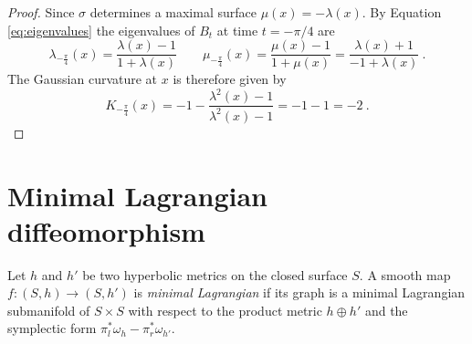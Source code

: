 \begin{proof}
    Since $\sigma$ determines a maximal surface $\mu(x) = - \lambda(x)$. By Equation \ref{eq:eigenvalues} the eigenvalues of $B_t$ at time $t=-\pi / 4$ are
    \[
        \lambda_{-\frac{\pi}{4}}(x) = \frac{\lambda(x) -1}{1 +\lambda(x)} \qquad \mu_{-\frac{\pi}{4}}(x) = \frac{\mu(x)-1}{1 + \mu(x)} = \frac{\lambda(x) + 1}{-1 + \lambda(x)} \ .
    \]
    The Gaussian curvature at $x$ is therefore given by
    \[
        K_{-\frac{\pi}{4}}(x) = - 1 - \frac{ \lambda^2(x) -1}{ \lambda^2(x) -1 } = -1 -1 = -2 \ .
    \]
\end{proof}

\section{Minimal Lagrangian diffeomorphism}

\begin{definition}
    Let $h$ and $h'$ be two hyperbolic metrics on the closed surface $S$. A smooth map $f: (S,h) \to (S,h')$ is \textit{minimal Lagrangian} if its graph is a minimal Lagrangian submanifold of $S\times S$ with respect to the product metric $h \oplus h'$ and the symplectic form $\pi_l^*\omega_h - \pi_r^* \omega_{h'}$. 
\end{definition}

